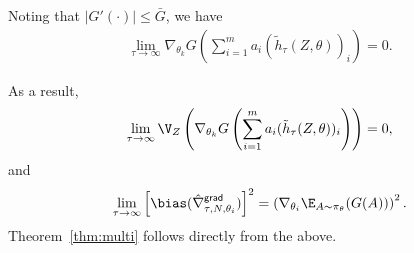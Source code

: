 Noting that $|G'(\cdot)| \le \bar{G}$, we have 
\begin{align*}
    \lim_{\tau \to \infty} \nabla_{\theta_k}
    G\left(\sum_{i=1}^m a_i (\tilde{h}_\tau(Z,\theta))_i \right) = 0.
\end{align*}

As a result,  
\begin{align*}
    \lim_{\tau \to \infty}\V_Z \left(\nabla_{\theta_k}
    G
    \left(\sum_{i=1}^m a_i (\tilde{h}_\tau(Z,\theta))_i \right)
    \right) =0,
\end{align*} and
\begin{align*}
    \lim_{\tau \to \infty} \left[\bias(\hat{\nabla}^{\mathsf{grad}}_{\tau,N, \theta_i})\right]^2 = \left(\nabla_{\theta_i} \E_{A\sim \pi_\theta}(G(A))\right)^2.
\end{align*} 
Theorem~\ref{thm:multi} follows directly from the above.






 